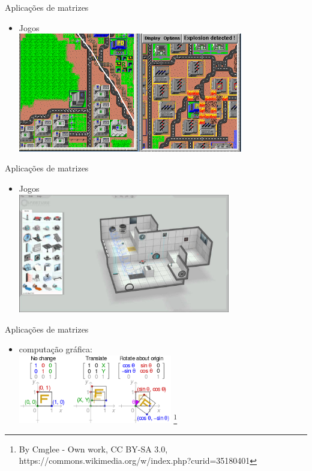 \documentclass[portuguese,10pt,xcolor=table]{bredelebeamer}
\begin{document}
	\begin{frame}
		\begin{center}
		\end{center}
	\end{frame} 

	\begin{frame}{Aplicações de matrizes}
		\begin{itemize}
			\item Jogos\\
				\includegraphics[height=5.2cm]{simcity.png}\\
		\end{itemize}
	\end{frame}
	\begin{frame}{Aplicações de matrizes}
		\begin{itemize}
			\item Jogos\\
				\includegraphics[height=5.2cm]{portal2.jpg}\\
		\end{itemize}
	\end{frame}

	\begin{frame}{Aplicações de matrizes}
		\begin{itemize}
			\item computação gráfica:\\
				\includegraphics[height=3.0cm]{transformacao.png}
						\footnote{By Cmglee - Own work, CC BY-SA 3.0, https://commons.wikimedia.org/w/index.php?curid=35180401}
		\end{itemize}
	\end{frame}
\end{document}
